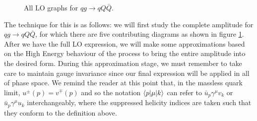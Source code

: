 \begin{figure}[t]
\caption{All LO graphs for $qg \to qQ\bar{Q}$.}
\label{fig:qg_qQQ_graphs}
\end{figure}


The technique for this is as follows: we will first study the complete amplitude for $qg \to qQ\bar{Q}$, for which there are five contributing diagrams as shown in figure \ref{fig:qg_qQQ_graphs}. After we have the full LO expression, we will make some approximations based on the High Energy behaviour of the process to bring the entire amplitude into the desired form. During this approximation stage, we must remember to take care to maintain gauge invariance since our final expression will be applied in all of phase space. We remind the reader at this point that, in the massless quark limit, $u^\pm(p) = v^\mp(p)$ and so the notation $\mathinner{\langle p\vert\mu\vert k\rangle}_{}$ can refer to $\bar{u}_p \gamma^\mu v_k$ or $\bar{u}_p \gamma^\mu u_k$ interchangeably, where the suppressed helicity indices are taken such that they conform to the definition above. 

